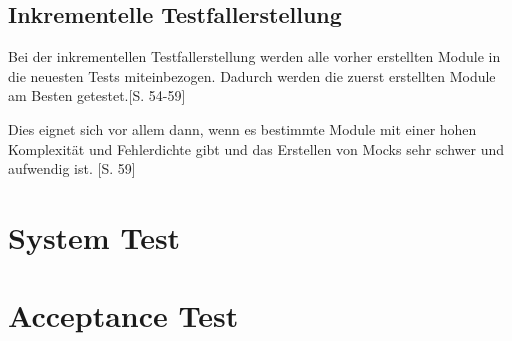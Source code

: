 \documentclass[a4paper,bibtotoc,oneside]{scrbook}
\begin{document}
\section{Inkrementelle Testfallerstellung}
Bei der inkrementellen Testfallerstellung werden alle vorher erstellten Module in die neuesten Tests miteinbezogen. Dadurch werden die zuerst erstellten Module am Besten getestet.\cite{test_large_systems}[S. 54-59]

Dies eignet sich vor allem dann, wenn es bestimmte Module mit einer hohen Komplexität und Fehlerdichte gibt und das Erstellen von Mocks sehr schwer und aufwendig ist. \cite{test_large_systems}[S. 59]



\chapter{System Test}

% 

%



\chapter{Acceptance Test}



%
%
\end{document}
